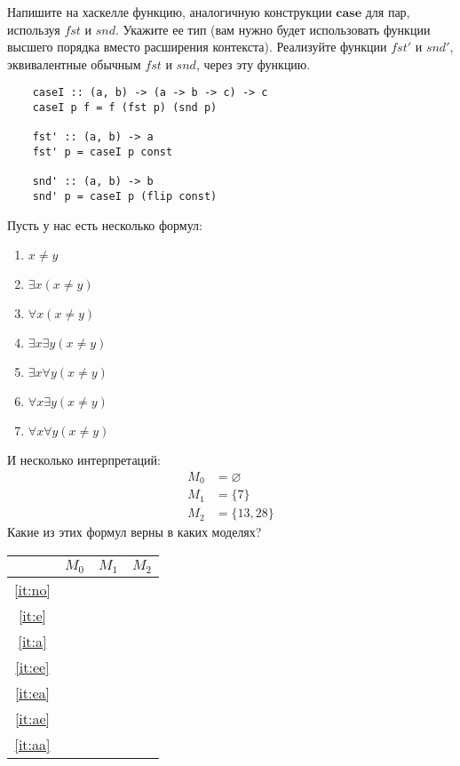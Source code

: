 \begin{task}[2]
	Напишите на хаскелле функцию, аналогичную конструкции $\bm{case}$ для пар, используя $fst$ и $snd$.
    Укажите ее тип (вам нужно будет использовать функции высшего порядка вместо расширения контекста).
    Реализуйте функции $fst'$ и $snd'$, эквивалентные обычным $fst$ и $snd$, через эту функцию.
\end{task}
\begin{solution}
\begin{lstlisting}
	caseI :: (a, b) -> (a -> b -> c) -> c 
	caseI p f = f (fst p) (snd p)

	fst' :: (a, b) -> a
	fst' p = caseI p const

	snd' :: (a, b) -> b
	snd' p = caseI p (flip const)
\end{lstlisting}
\end{solution}

\begin{task}[3]
	Пусть у нас есть несколько формул:
	\begin{enumerate}
		\item \label{it:no} $x \neq y$
		\item \label{it:e} $\exists x (x \neq y)$
		\item \label{it:a} $\forall x (x \neq y)$
		\item \label{it:ee} $\exists x \exists y (x \neq y)$
		\item \label{it:ea} $\exists x \forall y (x \neq y)$
		\item \label{it:ae} $\forall x \exists y (x \neq y)$
		\item \label{it:aa} $\forall x \forall y (x \neq y)$
	\end{enumerate}
	И несколько интерпретаций:
	\begin{align*}
	M_0 & = \varnothing \\
	M_1 & = \{ 7 \} \\
	M_2 & = \{ 13, 28 \}
	\end{align*}
	Какие из этих формул верны в каких моделях?
\end{task}
\begin{solution}
\begin{center}
\begin{tabular}{|c|c|c|c|}
	\hline
	            & $M_0$ & $M_1$ & $M_2$ \\
	\hline
	\ref{it:no} & \xtick  & \xcross & \xcross \\
	\ref{it:e}  & \xcross & \xcross & \xtick  \\
	\ref{it:a}  & \xtick  & \xcross & \xcross \\
	\ref{it:ee} & \xcross & \xcross & \xtick  \\
	\ref{it:ea} & \xcross & \xcross & \xcross \\
	\ref{it:ae} & \xtick  & \xcross & \xtick  \\
	\ref{it:aa} & \xtick  & \xcross & \xcross \\
	\hline
\end{tabular}
\end{center}
\end{solution}

